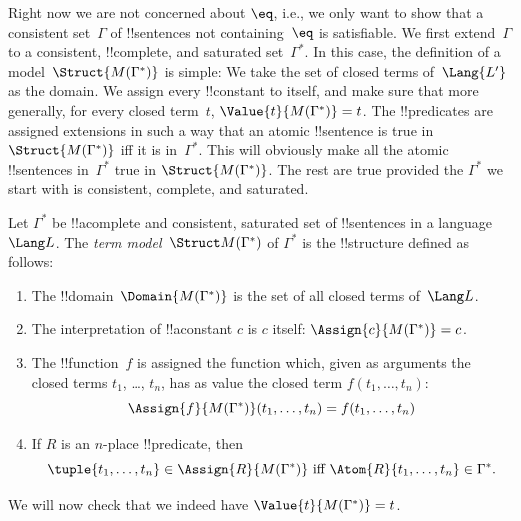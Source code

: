 

\begin{explain}
Right now we are not concerned about $\eq$, i.e., we only
  want to show that a consistent set~$\Gamma$ of !!{sentence}s not
  containing~$\eq$ is satisfiable. We first extend~$\Gamma$ to a
  consistent, !!{complete}, and saturated set~$\Gamma^*$.  In this
  case, the definition of a model~$\Struct{M(\Gamma^*)}$ is simple: We
  take the set of closed terms of~$\Lang{L'}$ as the domain. We assign
  every !!{constant} to itself, and make sure that more generally, for
  every closed term~$t$, $\Value{t}{M(\Gamma^*)} = t$.  The
  !!{predicate}s are assigned extensions in such a way that an atomic
  !!{sentence} is true in $\Struct{M(\Gamma^*)}$ iff it is
  in~$\Gamma^*$.  This will obviously make all the atomic
  !!{sentence}s in~$\Gamma^*$ true in $\Struct{M(\Gamma^*)}$. The rest
  are true provided the $\Gamma^*$ we start with is consistent,
  complete, and saturated.
\end{explain}


\begin{defn}
Let $\Gamma^*$ be !!a{complete} and consistent,
saturated set of !!{sentence}s in a language~$\Lang L$. The \emph{term
  model}~$\Struct M(\Gamma^*)$ of $\Gamma^*$ is the !!{structure}
defined as follows:
\begin{enumerate}
\item The !!{domain}~$\Domain{M(\Gamma^*)}$ is the set of all closed
  terms of~$\Lang L$.
\item The interpretation of !!a{constant} $c$ is $c$ itself:
  $\Assign{c}{M(\Gamma^*)} = c$.
\item The !!{function}~$f$ is assigned the function which, given as
  arguments the closed terms $t_1$, \dots, $t_n$, has as value the
  closed term $f(t_1, \dots, t_n)$:
\[
\Assign{f}{M(\Gamma^*)}(t_1, \dots, t_n) = f(t_1,\dots, t_n)
\]
\item If $R$ is an $n$-place !!{predicate}, then
  \[
  \tuple{t_1, \dots,
  t_n} \in \Assign{R}{M(\Gamma^*)} \text{ iff } \Atom{R}{t_1, \dots,
    t_n} \in \Gamma^*.
  \]
\end{enumerate}
\end{defn}



We will now check that we indeed have $\Value{t}{M(\Gamma^*)} = t$.

